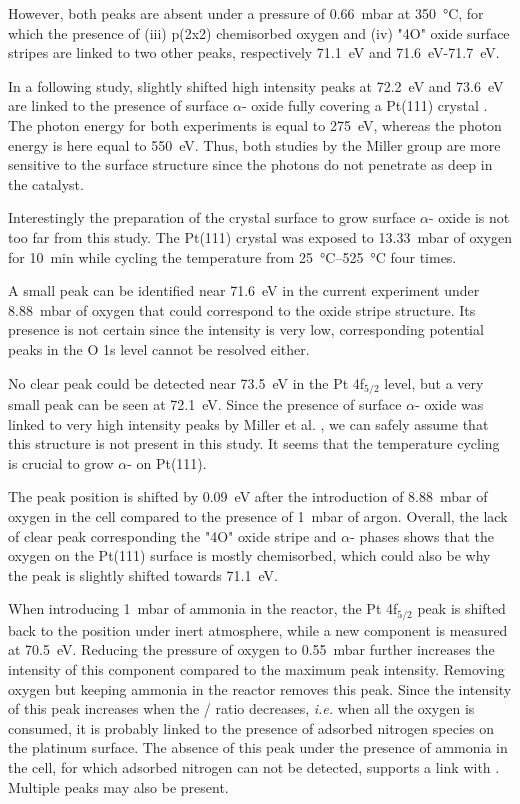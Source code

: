 However, both peaks are absent under a pressure of \qty{0.66}{\milli\bar} at \qty{350}{\degreeCelsius}, for which the presence of (iii) p(2x2) chemisorbed oxygen and (iv) "4O" oxide surface stripes are linked to two other peaks, respectively \qty{71.1}{\eV} and \qty{71.6}{\eV}-\qty{71.7}{\eV}.

In a following study, slightly shifted high intensity peaks at \qty{72.2}{\eV} and \qty{73.6}{\eV} are linked to the presence of surface $\alpha$- oxide fully covering a Pt(111) crystal \parencite{Miller2014}.
The photon energy for both experiments is equal to \qty{275}{\eV}, whereas the photon energy is here equal to \qty{550}{\eV}.
Thus, both studies by the Miller group are more sensitive to the surface structure since the photons do not penetrate as deep in the catalyst.

Interestingly the preparation of the crystal surface to grow surface $\alpha$- oxide is not too far from this study.
The Pt(111) crystal was exposed to \qty{13.33}{\milli\bar} of oxygen for \qty{10}{\minute} while cycling the temperature from \qtyrange{25}{525}{\degreeCelsius} four times.

A small peak can be identified near \qty{71.6}{\eV} in the current experiment under \qty{8.88}{\milli\bar} of oxygen that could correspond to the oxide stripe structure.
Its presence is not certain since the intensity is very low, corresponding potential peaks in the O 1s level cannot be resolved either.

No clear peak could be detected near \qty{73.5}{\eV} in the Pt 4f$_{5/2}$ level, but a very small peak can be seen at \qty{72.1}{\eV}.
Since the presence of surface $\alpha$- oxide was linked to very high intensity peaks by Miller et al. \parencite{Miller2014}, we can safely assume that this structure is not present in this study.
It seems that the temperature cycling is crucial to grow $\alpha$- on Pt(111).

The peak position is shifted by \qty{0.09}{\eV} after the introduction of \qty{8.88}{\milli\bar} of oxygen in the cell compared to the presence of \qty{1}{\milli\bar} of argon.
Overall, the lack of clear peak corresponding the "4O" oxide stripe and $\alpha$- phases shows that the oxygen on the Pt(111) surface is mostly chemisorbed, which could also be why the peak is slightly shifted towards \qty{71.1}{\eV}.

When introducing \qty{1}{\milli\bar} of ammonia in the reactor, the Pt 4f$_{5/2}$ peak is shifted back to the position under inert atmosphere, while a new component is measured at \qty{70.5}{\eV}.
Reducing the pressure of oxygen to \qty{0.55}{\milli\bar} further increases the intensity of this component compared to the maximum peak intensity.
Removing oxygen but keeping ammonia in the reactor removes this peak.
Since the intensity of this peak increases when the / ratio decreases, \textit{i.e.} when all the oxygen is consumed, it is probably linked to the presence of adsorbed nitrogen species on the platinum surface.
The absence of this peak under the presence of ammonia in the cell, for which adsorbed nitrogen can not be detected, supports a link with .
Multiple peaks may also be present.

